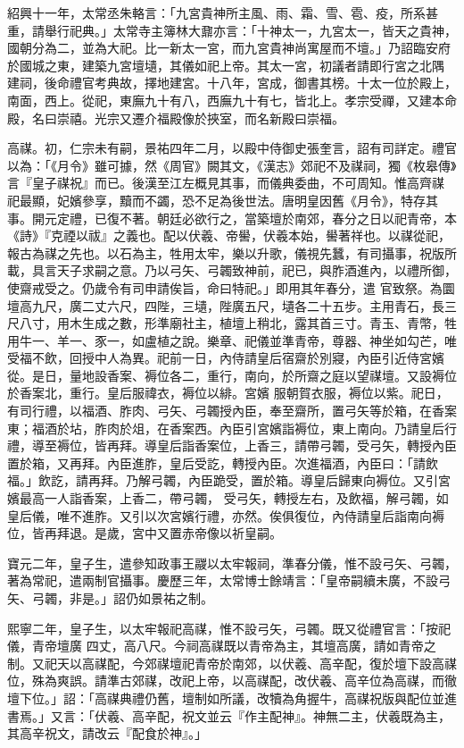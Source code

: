\begin{pinyinscope}
 紹興十一年，太常丞朱輅言：「九宮貴神所主風、雨、霜、雪、雹、疫，所系甚重，請舉行祀典。」太常寺主簿林大鼐亦言：「十神太一，九宮太一，皆天之貴神，國朝分為二，並為大祀。比一新太一宮，而九宮貴神尚寓屋而不壇。」乃詔臨安府於國城之東，建築九宮壇壝，其儀如祀上帝。其太一宮，初議者請即行宮之北隅
 建祠，後命禮官考典故，擇地建宮。十八年，宮成，御書其榜。十太一位於殿上，南面，西上。從祀，東廡九十有八，西廡九十有七，皆北上。孝宗受禪，又建本命殿，名曰崇禧。光宗又遷介福殿像於挾室，而名新殿曰崇福。



 高禖。初，仁宗未有嗣，景祐四年二月，以殿中侍御史張奎言，詔有司詳定。禮官以為：「《月令》雖可據，然《周官》闕其文，《漢志》郊祀不及禖祠，獨《枚皋傳》言『皇子禖祝』而已。後漢至江左概見其事，而儀典委曲，不可周知。惟高齊禖
 祀最顯，妃嬪參享，黷而不蠲，恐不足為後世法。唐明皇因舊《月令》，特存其事。開元定禮，已復不著。朝廷必欲行之，當築壇於南郊，春分之日以祀青帝，本《詩》『克禋以祓』之義也。配以伏羲、帝嚳，伏羲本始，嚳著祥也。以禖從祀，報古為禖之先也。以石為主，牲用太牢，樂以升歌，儀視先蠶，有司攝事，祝版所載，具言天子求嗣之意。乃以弓矢、弓韣致神前，祀已，與胙酒進內，以禮所御，使齋戒受之。仍歲令有司申請俟旨，命曰特祀。」即用其年春分，遣
 官致祭。為圜壇高九尺，廣二丈六尺，四陛，三壝，陛廣五尺，壝各二十五步。主用青石，長三尺八寸，用木生成之數，形準廟社主，植壇上稍北，露其首三寸。青玉、青幣，牲用牛一、羊一、豕一，如盧植之說。樂章、祀儀並準青帝，尊器、神坐如勾芒，唯受福不飲，回授中人為異。祀前一日，內侍請皇后宿齋於別寢，內臣引近侍宮嬪從。是日，量地設香案、褥位各二，重行，南向，於所齋之庭以望禖壇。又設褥位於香案北，重行。皇后服禕衣，褥位以緋。宮嬪
 服朝賀衣服，褥位以紫。祀日，有司行禮，以福酒、胙肉、弓矢、弓韣授內臣，奉至齋所，置弓矢等於箱，在香案東；福酒於坫，胙肉於俎，在香案西。內臣引宮嬪詣褥位，東上南向。乃請皇后行禮，導至褥位，皆再拜。導皇后詣香案位，上香三，請帶弓韣，受弓矢，轉授內臣置於箱，又再拜。內臣進胙，皇后受訖，轉授內臣。次進福酒，內臣曰：「請飲福。」飲訖，請再拜。乃解弓韣，內臣跪受，置於箱。導皇后歸東向褥位。又引宮嬪最高一人詣香案，上香二，帶弓韣，
 受弓矢，轉授左右，及飲福，解弓韣，如皇后儀，唯不進胙。又引以次宮嬪行禮，亦然。俟俱復位，內侍請皇后詣南向褥位，皆再拜退。是歲，宮中又置赤帝像以祈皇嗣。



 寶元二年，皇子生，遣參知政事王鬷以太牢報祠，準春分儀，惟不設弓矢、弓韣，著為常祀，遣兩制官攝事。慶歷三年，太常博士餘靖言：「皇帝嗣續未廣，不設弓矢、弓韣，非是。」詔仍如景祐之制。



 熙寧二年，皇子生，以太牢報祀高禖，惟不設弓矢，弓韣。既又從禮官言：「按祀儀，青帝壇廣
 四丈，高八尺。今祠高禖既以青帝為主，其壇高廣，請如青帝之制。又祀天以高禖配，今郊禖壇祀青帝於南郊，以伏羲、高辛配，復於壇下設高禖位，殊為爽誤。請準古郊禖，改祀上帝，以高禖配，改伏羲、高辛位為高禖，而徹壇下位。」詔：「高禖典禮仍舊，壇制如所議，改犢為角握牛，高禖祝版與配位並進書焉。」又言：「伏羲、高辛配，祝文並云『作主配神』。神無二主，伏羲既為主，其高辛祝文，請改云『配食於神』。」




\end{pinyinscope}
